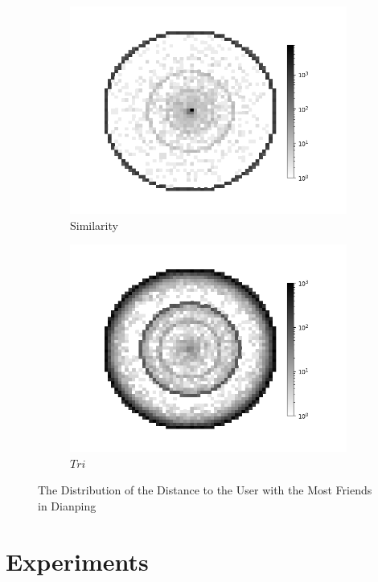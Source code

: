 \documentclass{article}
\begin{document}
\begin{figure}[h]    
  \centering
  \begin{subfigure}{0.4\textwidth}
    \centering
      \includegraphics[width=1\linewidth]{pic/figure5_1.png}
    \caption{Similarity}
  \end{subfigure}%
  \begin{subfigure}{0.4\textwidth}
  \centering
      \includegraphics[width=1\linewidth]{pic/figure5_2.png}
    \caption{$Tri$}
  \end{subfigure}%
\caption{The Distribution of the Distance to the User with the Most Friends in Dianping}
\end{figure}
\section{Experiments}
\label{experiments}
\end{document}
